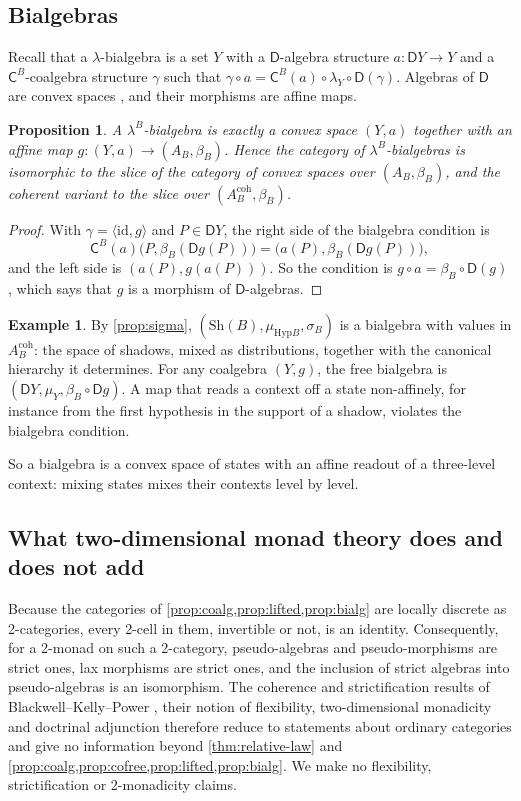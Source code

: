 \documentclass[11pt]{article}
\newtheorem{proposition}[theorem]{Proposition}
\theoremstyle{definition}
\newtheorem{example}[theorem]{Example}
\theoremstyle{remark}
\newcommand{\D}{\mathsf{D}}
\newcommand{\Hyp}{\mathrm{Hyp}}
\newcommand{\Sh}{\mathrm{Sh}}
\newcommand{\C}{\mathsf{C}}
\newcommand{\id}{\mathrm{id}}
\begin{document}
\subsection{Bialgebras}

Recall that a $\lambda$-bialgebra is a set $Y$ with a $\D$-algebra structure $a\colon\D Y\to Y$ and a
$\C^B$-coalgebra structure $\gamma$ such that $\gamma\circ a=\C^B(a)\circ\lambda_Y\circ\D(\gamma)$.
Algebras of $\D$ are convex spaces \cite{Fritz2009}, and their morphisms are affine maps.

\begin{proposition}\label{prop:bialg}
A $\lambda^B$-bialgebra is exactly a convex space $(Y,a)$ together with an affine map
$g\colon(Y,a)\to(A_B,\beta_B)$. Hence the category of $\lambda^B$-bialgebras is isomorphic to the slice
of the category of convex spaces over $(A_B,\beta_B)$, and the coherent variant to the slice over
$(A^{\mathrm{coh}}_B,\beta_B)$.
\end{proposition}
\begin{proof}
With $\gamma=\langle\id,g\rangle$ and $P\in\D Y$, the right side of the bialgebra condition is
\[
\C^B(a)\big(P,\beta_B(\D g(P))\big)=\big(a(P),\beta_B(\D g(P))\big),
\]
and the left side is $(a(P),g(a(P)))$. So the
condition is $g\circ a=\beta_B\circ\D(g)$, which says that $g$ is a morphism of $\D$-algebras.
\end{proof}

\begin{example}
By \cref{prop:sigma}, $(\Sh(B),\mu_{\Hyp B},\sigma_B)$ is a bialgebra with values in
$A^{\mathrm{coh}}_B$: the space of shadows, mixed as distributions, together with the canonical
hierarchy it determines. For any coalgebra $(Y,g)$, the free bialgebra is
$(\D Y,\mu_Y,\beta_B\circ\D g)$. A map that reads a context off a state non-affinely, for instance from
the first hypothesis in the support of a shadow, violates the bialgebra condition.
\end{example}

So a bialgebra is a convex space of states with an affine readout of a three-level context: mixing
states mixes their contexts level by level.

\subsection{What two-dimensional monad theory does and does not add}\label{sec:2d}

Because the categories of \cref{prop:coalg,prop:lifted,prop:bialg} are locally discrete as
2-categories, every 2-cell in them, invertible or not, is an identity. Consequently, for
a 2-monad on such a 2-category, pseudo-algebras and pseudo-morphisms are strict ones, lax morphisms
are strict ones, and the inclusion of strict algebras into pseudo-algebras is an isomorphism. The
coherence and strictification results of Blackwell--Kelly--Power \cite{BKP1989,Lack2002}, their
notion of flexibility, two-dimensional monadicity \cite{Bourke2014} and doctrinal adjunction
\cite{Kelly1974} therefore reduce to statements about ordinary categories and give no information
beyond \cref{thm:relative-law} and \cref{prop:coalg,prop:cofree,prop:lifted,prop:bialg}. We make no
flexibility, strictification or 2-monadicity claims.
\end{document}
